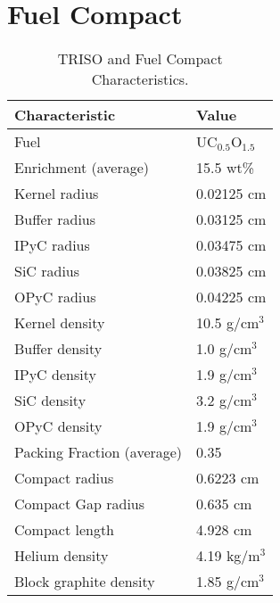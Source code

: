 \documentclass[11pt,letterpaper]{article}
\begin{document}

\section{Fuel Compact}

	\begin{table}[]
		\centering
	    \caption{TRISO and Fuel Compact Characteristics.}
	    \label{tab:compact}
		\begin{tabular}{l|l}
		\hline
		Characteristic                   & Value                \\ \hline
		Fuel                             & UC$_{0.5}$O$_{1.5}$  \\
		Enrichment (average)             & 15.5 wt\%            \\
		Kernel radius                    & 0.02125 cm           \\
		Buffer radius                    & 0.03125 cm           \\
		IPyC radius                      & 0.03475 cm           \\
		SiC radius                       & 0.03825 cm           \\
		OPyC radius                      & 0.04225 cm           \\
    	Kernel density                   & 10.5 g/cm$^3$        \\
		Buffer density                   & 1.0 g/cm$^3$         \\
		IPyC density                     & 1.9 g/cm$^3$         \\
		SiC density                      & 3.2 g/cm$^3$         \\
		OPyC density                     & 1.9 g/cm$^3$         \\
		Packing Fraction (average)       & 0.35                 \\
		Compact radius                   & 0.6223 cm            \\
		Compact Gap radius               & 0.635 cm             \\
		Compact length                   & 4.928 cm             \\ 
        Helium density           		 & 4.19 kg/m$^3$        \\
        Block graphite density           & 1.85 g/cm$^3$        \\ \hline

		\end{tabular}
	\end{table}
\end{document}
